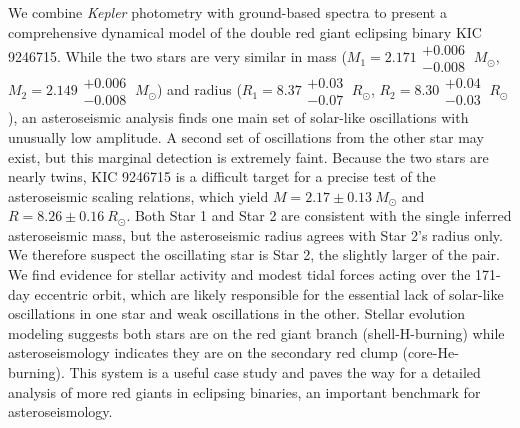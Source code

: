 We combine \emph{Kepler} photometry with ground-based spectra to present a comprehensive dynamical model of the double red giant eclipsing binary KIC 9246715. While the two stars are very similar in mass ($M_1 = 2.171\substack{+0.006 \\ -0.008} \ M_{\odot}$, $M_2 = 2.149\substack{+0.006 \\ -0.008} \ M_{\odot}$) and radius ($R_1 = 8.37\substack{+0.03 \\ -0.07} \ R_{\odot}$, $R_2 = 8.30\substack{+0.04 \\ -0.03} \ R_{\odot}$), an asteroseismic analysis finds one main set of solar-like oscillations with unusually low amplitude. A second set of oscillations from the other star may exist, but this marginal detection is extremely faint. Because the two stars are nearly twins, KIC 9246715 is a difficult target for a precise test of the asteroseismic scaling relations, which yield $M = 2.17\pm0.13 \ M_{\odot}$ and $R = 8.26\pm0.16 \ R_{\odot}$. Both Star 1 and Star 2 are consistent with the single inferred asteroseismic mass, but the asteroseismic radius agrees with Star 2's radius only. We therefore suspect the oscillating star is Star 2, the slightly larger of the pair. We find evidence for stellar activity and modest tidal forces acting over the 171-day eccentric orbit, which are likely responsible for the essential lack of solar-like oscillations in one star and weak oscillations in the other. Stellar evolution modeling suggests both stars are on the red giant branch (shell-H-burning) while asteroseismology indicates they are on the secondary red clump (core-He-burning). This system is a useful case study and paves the way for a detailed analysis of more red giants in eclipsing binaries, an important benchmark for asteroseismology.
  
  
  
  
  